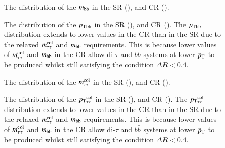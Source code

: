     \begin{figure}[htbp]
        \centering
        \caption{
            The distribution of the $m_\mathrm{bb}$ in the SR (\protect{}), and CR (\protect{}).
        }
        \label{fig:mbb}
    \end{figure}
    \begin{figure}[htbp]
        \centering
        \caption{
            The distribution of the $p_{\text{T}}{}_\mathrm{bb}$ in the SR (\protect{}), and CR (\protect{}).
            The $p_{\text{T}}{}_\mathrm{bb}$ distribution extends to lower values in the CR than in the SR due to the relaxed $m_\mathrm{\tau\tau}^\mathrm{col}$ and $m_\mathrm{bb}$ requirements.  
            This is because lower values of $m_\mathrm{\tau\tau}^\mathrm{col}$ and $m_\mathrm{bb}$ in the CR allow di-$\tau$ and $b\bar{b}$ systems at 
            lower $p_{\text{T}}$ to be produced whilst still satisfying the condition $\Delta{R} < 0.4$.
        }
        \label{fig:pTbb}
    \end{figure}
    \begin{figure}[htbp]
        
        \centering
        \caption{
            The distribution of the $m_\mathrm{\tau\tau}^\mathrm{col}$ in the SR (\protect{}), and CR (\protect{}).
        }
        \label{fig:mtt}
    \end{figure}   
    \begin{figure}[htbp]
        \centering
        \caption{
            The distribution of the $p_{\text{T}}{}_\mathrm{\tau\tau}^\mathrm{col}$ in the SR (\protect{}), and CR (\protect{}).
            The $p_{\text{T}}{}_\mathrm{\tau\tau}^\mathrm{col}$ distribution extends to lower values in the CR than in the SR due to the relaxed $m_\mathrm{\tau\tau}^\mathrm{col}$ and $m_\mathrm{bb}$ requirements.  
            This is because lower values of $m_\mathrm{\tau\tau}^\mathrm{col}$ and $m_\mathrm{bb}$ in the CR allow di-$\tau$ and $b\bar{b}$ systems at 
            lower $p_{\text{T}}$ to be produced whilst still satisfying the condition $\Delta{R} < 0.4$.
        }
        \label{fig:pTtt}
    \end{figure}
